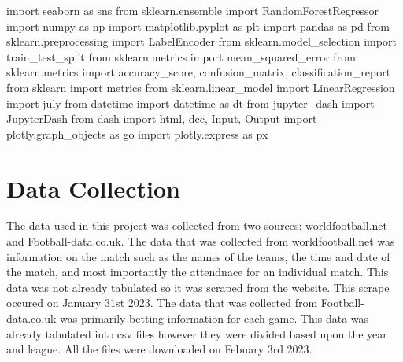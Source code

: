 \documentclass[
  letterpaper,
  DIV=11,
  numbers=noendperiod]{scrartcl}
\newenvironment{Shaded}{\begin{snugshade}}{\end{snugshade}}
\newcommand{\ImportTok}[1]{\textcolor[rgb]{0.00,0.46,0.62}{#1}}
\newcommand{\NormalTok}[1]{\textcolor[rgb]{0.00,0.23,0.31}{#1}}
\begin{document}
\begin{Shaded}
\begin{Highlighting}[]
\ImportTok{import}\NormalTok{ seaborn }\ImportTok{as}\NormalTok{ sns}
\ImportTok{from}\NormalTok{ sklearn.ensemble }\ImportTok{import}\NormalTok{ RandomForestRegressor}
\ImportTok{import}\NormalTok{ numpy }\ImportTok{as}\NormalTok{ np}
\ImportTok{import}\NormalTok{ matplotlib.pyplot }\ImportTok{as}\NormalTok{ plt}
\ImportTok{import}\NormalTok{ pandas }\ImportTok{as}\NormalTok{ pd}
\ImportTok{from}\NormalTok{ sklearn.preprocessing }\ImportTok{import}\NormalTok{ LabelEncoder}
\ImportTok{from}\NormalTok{ sklearn.model\_selection }\ImportTok{import}\NormalTok{ train\_test\_split}
\ImportTok{from}\NormalTok{ sklearn.metrics }\ImportTok{import}\NormalTok{ mean\_squared\_error}
\ImportTok{from}\NormalTok{ sklearn.metrics }\ImportTok{import}\NormalTok{ accuracy\_score, confusion\_matrix, classification\_report}
\ImportTok{from}\NormalTok{ sklearn }\ImportTok{import}\NormalTok{ metrics}
\ImportTok{from}\NormalTok{ sklearn.linear\_model }\ImportTok{import}\NormalTok{ LinearRegression}
\ImportTok{import}\NormalTok{ july}
\ImportTok{from}\NormalTok{ datetime }\ImportTok{import}\NormalTok{ datetime }\ImportTok{as}\NormalTok{ dt}
\ImportTok{from}\NormalTok{ jupyter\_dash }\ImportTok{import}\NormalTok{ JupyterDash}
\ImportTok{from}\NormalTok{ dash }\ImportTok{import}\NormalTok{ html, dcc, Input, Output}
\ImportTok{import}\NormalTok{ plotly.graph\_objects }\ImportTok{as}\NormalTok{ go}
\ImportTok{import}\NormalTok{ plotly.express }\ImportTok{as}\NormalTok{ px}
\end{Highlighting}
\end{Shaded}

\hypertarget{data-collection}{%
\section{Data Collection}\label{data-collection}}

The data used in this project was collected from two sources:
worldfootball.net and Football-data.co.uk. The data that was collected
from worldfootball.net was information on the match such as the names of
the teams, the time and date of the match, and most importantly the
attendnace for an individual match. This data was not already tabulated
so it was scraped from the website. This scrape occured on January 31st
2023. The data that was collected from Football-data.co.uk was primarily
betting information for each game. This data was already tabulated into
csv files however they were divided based upon the year and league. All
the files were downloaded on Febuary 3rd 2023.
\end{document}
